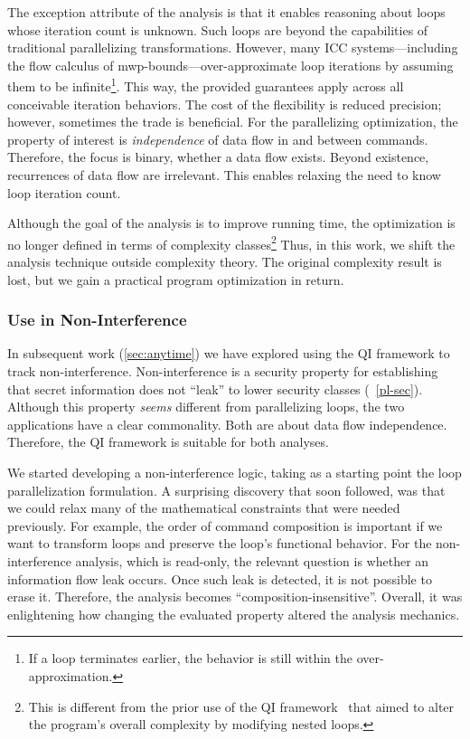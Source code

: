 The exception attribute of the analysis is that it enables reasoning about
loops whose iteration count is unknown.
Such loops are beyond the capabilities of traditional parallelizing transformations.
However, many ICC systems---including the flow calculus of mwp-bounds---over-approximate loop iterations by assuming them to be infinite\footnote{If a loop terminates earlier, the behavior is still within the over-approximation.}.
This way, the provided guarantees apply across all conceivable iteration behaviors.
The cost of the flexibility is reduced precision;
however, sometimes the trade is beneficial.
For the parallelizing optimization, the property of interest is \emph{independence} of data flow in and between commands.
Therefore, the focus is binary, \ie whether a data flow exists.
Beyond existence, recurrences of data flow are irrelevant.
This enables relaxing the need to know loop iteration count.

Although the goal of the analysis is to improve running time,
the optimization is no longer defined in terms of complexity classes\footnote{
This is different from the prior use of the QI framework~\cite{moyen20172}
that aimed to alter the program's overall complexity by modifying nested loops.}
Thus, in this work, we shift the analysis technique outside complexity theory.
The original complexity result is lost, but we gain a practical program optimization in return.

\subsubsection{Use in Non-Interference}
\label{subsubsec:qi-ni}

In subsequent work (\autoref{sec:anytime}) we have explored  using the QI framework to track non-interference.
Non-interference is a security property for establishing that secret information does not \enquote{leak} to lower security classes (\cf~\autoref{pl-sec}).
Although this property \emph{seems} different from parallelizing loops, the two applications have a clear commonality.
Both are about data flow independence.
Therefore, the QI framework is suitable for both analyses.

We started developing a non-interference logic, taking as a starting point the loop parallelization formulation.
A surprising discovery that soon followed, was that we could relax many of the mathematical constraints that were needed previously.
For example, the order of command composition is important if we want to transform loops and preserve the loop's functional behavior.
For the non-interference analysis, which is read-only, the relevant question is whether an information flow leak occurs.
Once such leak is detected, it is not possible to erase it.
Therefore, the analysis becomes \enquote{composition-insensitive}.
Overall, it was enlightening how changing the evaluated property altered the analysis mechanics.

